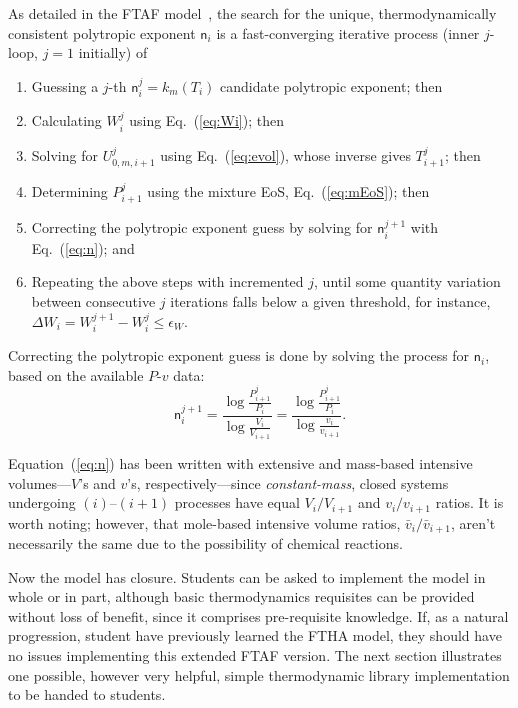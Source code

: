     As detailed in the FTAF model~\cite{2017-NaaktgeborenC-IntJMechEngEduc}, the search for the unique, thermodynamically consistent polytropic exponent  $\mathsf{n}_i$  is  a  fast-converging
    iterative process (inner $j$-loop, $j=1$ initially) of

    \begin{enumerate}
        \item Guessing a $j$-th $\mathsf{n}_i^j = k_m(T_i)$ candidate polytropic exponent; then
        \item Calculating $W_i^j$ using Eq.~(\ref{eq:Wi}); then
        \item Solving for $U_{0,m,i+1}^j$ using Eq.~(\ref{eq:evol}), whose inverse gives $T_{i+1}^j$; then
        \item Determining $P_{i+1}^j$ using the mixture EoS, Eq.~(\ref{eq:mEoS}); then
        \item Correcting the polytropic exponent guess by solving for $\mathsf{n}_i^{j+1}$ with Eq.~(\ref{eq:n}); and
        \item Repeating the above steps with incremented $j$, until some quantity variation between consecutive $j$ iterations falls below a  given  threshold,  for  instance,  $\Delta{W_i}  =
            W_i^{j+1} - W_i^j \leqslant \epsilon_W$.
    \end{enumerate}

    Correcting the polytropic exponent guess is done by solving the process for $\mathsf{n}_i$, based on the available $P$-$v$ data:%
    \begin{equation}
        \mathsf{n}_i^{j+1}  = \frac{\displaystyle \log\frac{P_{i+1}^j}{P_i}}{\displaystyle \log\frac{V_i}{V_{i+1}}}
                            = \frac{\displaystyle \log\frac{P_{i+1}^j}{P_i}}{\displaystyle \log\frac{v_i}{v_{i+1}}}.
        \label{eq:n}
    \end{equation}

    Equation~(\ref{eq:n}) has been  written  with  extensive  and  mass-based  intensive  volumes---$V$'s  and  $v$'s,  respectively---since  \emph{constant-mass},  closed  systems  undergoing
    $(i)$--$(i+1)$ processes have equal $V_i / V_{i+1}$ and $v_i / v_{i+1}$ ratios. It is worth noting; however, that mole-based intensive volume ratios, $\bar{v}_i  /  \bar{v}_{i+1}$,  aren't
    necessarily the same due to the possibility of chemical reactions.

    Now the model has closure. Students can be asked to implement the model in whole or in part, although basic thermodynamics requisites can be provided without  loss  of  benefit,  since  it
    comprises pre-requisite knowledge. If, as a natural progression, student have previously learned the FTHA model, they should have no issues implementing this  extended  FTAF  version.  The
    next section illustrates one possible, however very helpful, simple thermodynamic library implementation to be handed to students.


